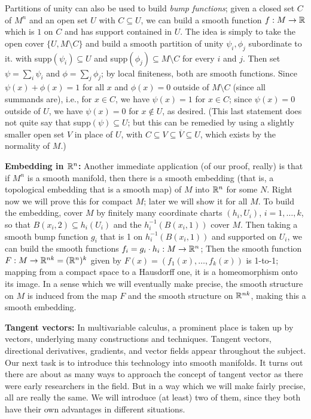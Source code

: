 \ssk

Partitions of unity can also be used to build {\it bump functions};
given a closed set $C$ of $M^n$ and an open set $U$ with $C\subseteq U$, we can build a smooth
function $f:M\rightarrow {\Bbb R}$ which is $1$ on $C$ and has support contained in $U$. The idea is simply to take the 
open cover $\{U,M\setminus C\}$ and build a smooth partition of unity $\psi_i,\phi_j$ subordinate to it.
with supp$(\psi_i)\subseteq U$ and supp$(\phi_j)\subseteq   M\setminus C$ for every $i$ and $j$.
Then set $\psi=\sum_i\psi_i$ and $\phi=\sum_j\phi_j$; by local finiteness, both are smooth functions.
Since $\psi(x)+\phi(x)=1$ for all $x$ and $\phi(x)=0$ outside of $M\setminus C$ (since all summands are), i.e., 
for $x\in C$,
we have $\psi(x)=1$ for $x\in C$; since $\psi(x)=0$ outside of $U$, we have
$\psi(x)=0$ for $x\notin U$, as desired. (This last statement does not quite say that supp$(\psi)\subseteq U$;
but this can be remedied by using a slightly smaller open set $V$ in place of $U$, with 
$C\subseteq V\subseteq \overline{V}\subseteq U$, which exists by the normality of $M$.)

\msk

{\bf Embedding in ${\Bbb R}^n$:} Another immediate application (of our proof, really) is that if 
$M^n$ is a smooth manifold, then 
there is a smooth
embedding (that is, a topological embedding that is a smooth map) of $M$ into 
${\Bbb R}^n$ for some $N$. Right now we will prove this for compact
$M$; later we will show it for all $M$. To build the embedding, cover $M$ by finitely many 
coordinate charts $(h_i,U_i)$,
$i=1,\ldots ,k$, so that $B(x_i,2)\subseteq h_i(U_i)$ and the $h_i^{-1}(B(x_i,1))$ cover $M$.
Then taking a smooth bump function $g_i$ that is 1 on $h_i^{-1}(B(x_i,1))$ and supported on $U_i$, we can build 
the smooth functions $f_i=g_i\cdot h_i:M\rightarrow {\Bbb R}^n$; Then the smooth function
$F:M\rightarrow {\Bbb R}^{nk}=({\Bbb R}^n)^k$ given by $F(x)=(f_1(x),\ldots ,f_k(x))$ is 1-to-1; 
mapping from a compact space to a Hausdorff one, it is a homeomorphism onto its image.
In a sense which we will eventually make precise, the smooth structure on $M$ is induced
from the map $F$ and the smooth structure on ${\Bbb R}^{nk}$, making this a smooth embedding.

\msk

{\bf Tangent vectors:} In multivariable calculus, a prominent place is taken up by vectors, 
underlying many constructions and techniques. Tangent vectors, directional
derivatives, gradients, and vector fields appear throughout the subject. Our next task is to 
introduce this technology into smooth manifolds.
It turns out there are about as many ways to approach the concept of tangent vector as there were
early researchers in the field. But in a way which we will make fairly precise, all are really
the same. We will introduce (at least) two of them, since they both have their own advantages
in different situations. 

